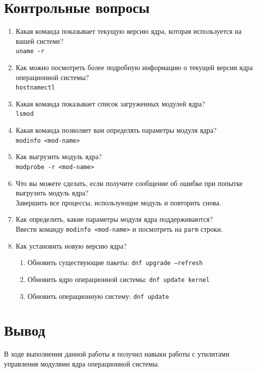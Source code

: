 \documentclass[12pt]{article}
\begin{document}
\section{Контрольные вопросы}
\begin{enumerate}
	\item Какая команда показывает текущую версию ядра, которая используется на вашей системе? \\
	      \texttt{uname -r}
	\item Как можно посмотреть более подробную информацию о текущей версии ядра операционной системы? \\
	      \texttt{hostnamectl}
	\item Какая команда показывает список загруженных модулей ядра? \\
	      \texttt{lsmod}
	\item Какая команда позволяет вам определять параметры модуля ядра? \\
	      \texttt{modinfo <mod-name>}
	\item Как выгрузить модуль ядра? \\
	      \texttt{modprobe -r <mod-name>}
	\item Что вы можете сделать, если получите сообщение об ошибке при попытке выгрузить модуль ядра? \\
	      Завершить все процессы, использующие модуль и повторить снова.
	\item Как определить, какие параметры модуля ядра поддерживаются? \\
	      Ввести команду \texttt{modinfo <mod-name>} и посмотреть на \texttt{parm} строки.
	\item Как установить новую версию ядра? \\
	      \begin{enumerate}
		      \item Обновить существующие пакеты: \texttt{dnf upgrade --refresh}
		      \item Обновить ядро операционной системы: \texttt{dnf update kernel}
		      \item Обновить операционную систему: \texttt{dnf update}
	      \end{enumerate}
\end{enumerate}

\section{Вывод}
В ходе выполнения данной работы я получил навыки работы с утилитами управления модулями ядра операционной системы.
\end{document}

